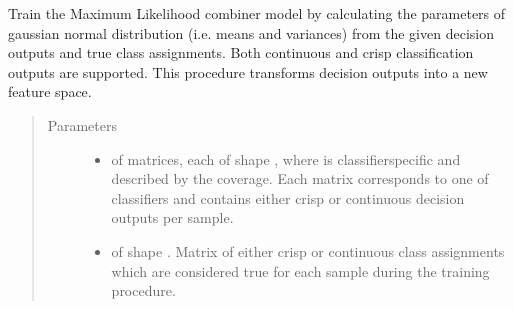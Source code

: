\documentclass[letterpaper,10pt,english]{sphinxmanual}
\begin{document}
\begin{fulllineitems}
\begin{fulllineitems}
\label{\detokenize{pusion.core.maximum_likelihood_combiner:pusion.core.maximum_likelihood_combiner.CRMaximumLikelihoodCombiner.train}}
\sphinxAtStartPar
Train the Maximum Likelihood combiner model by calculating the parameters of gaussian normal distribution
(i.e. means and variances) from the given decision outputs and true class assignments.
Both continuous and crisp classification outputs are supported. This procedure transforms decision outputs
into a new feature space.
\begin{quote}\begin{description}
\item[{Parameters}] \leavevmode\begin{itemize}
\item {} 
\sphinxAtStartPar
{} \textendash{}  of  matrices, each of shape ,
where  is classifier\sphinxhyphen{}specific and described by the coverage.
Each matrix corresponds to one of  classifiers and contains either crisp or continuous
decision outputs per sample.

\item {} 
\sphinxAtStartPar
{} \textendash{}  of shape .
Matrix of either crisp or continuous class assignments which are considered true for each sample during
the training procedure.

\end{itemize}

\end{description}\end{quote}

\end{fulllineitems}



\end{fulllineitems}
\end{document}
